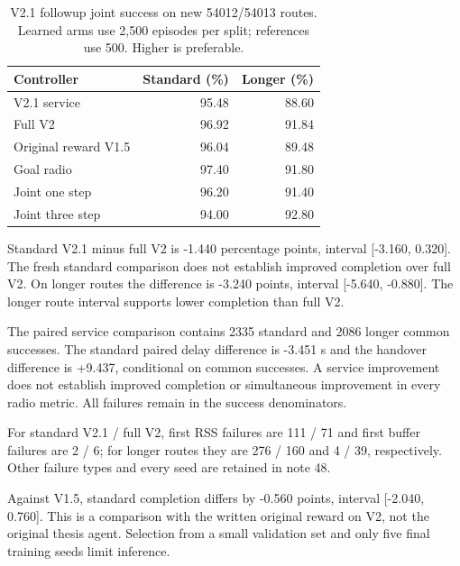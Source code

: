 \begin{table}[t]\centering\small

\caption{V2.1 followup joint success on new 54012/54013 routes. Learned arms use 2,500 episodes per split; references use 500. Higher is preferable.}

\label{tab:v21success}

\begin{tabular}{lrr}\toprule Controller & Standard (\%) & Longer (\%)\\\midrule
V2.1 service & 95.48 & 88.60\\
Full V2 & 96.92 & 91.84\\
Original reward V1.5 & 96.04 & 89.48\\
Goal radio & 97.40 & 91.80\\
Joint one step & 96.20 & 91.40\\
Joint three step & 94.00 & 92.80\\
\bottomrule\end{tabular}\end{table}

Standard V2.1 minus full V2 is -1.440 percentage points, interval [-3.160, 0.320]. The fresh standard comparison does not establish improved completion over full V2. On longer routes the difference is -3.240 points, interval [-5.640, -0.880]. The longer route interval supports lower completion than full V2.

The paired service comparison contains 2335 standard and 2086 longer common successes. The standard paired delay difference is -3.451 s and the handover difference is +9.437, conditional on common successes. A service improvement does not establish improved completion or simultaneous improvement in every radio metric. All failures remain in the success denominators.

For standard V2.1 / full V2, first RSS failures are 111 / 71 and first buffer failures are 2 / 6; for longer routes they are 276 / 160 and 4 / 39, respectively. Other failure types and every seed are retained in note 48.

Against V1.5, standard completion differs by -0.560 points, interval [-2.040, 0.760]. This is a comparison with the written original reward on V2, not the original thesis agent. Selection from a small validation set and only five final training seeds limit inference.

